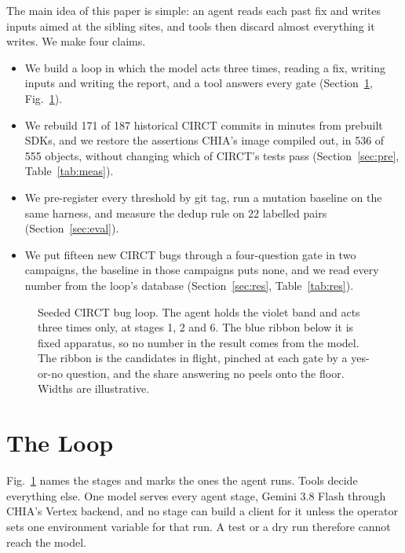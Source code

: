 \documentclass[conference]{IEEEtran}
\begin{document}
The main idea of this paper is simple: an agent reads each past fix and writes
inputs aimed at the sibling sites, and tools then discard almost everything it
writes. We make four claims.
\begin{itemize}
\item We build a loop in which the model acts three times, reading a fix,
  writing inputs and writing the report, and a tool answers every gate
  (Section~\ref{sec:loop}, Fig.~\ref{fig:loop}).
\item We rebuild 171 of 187 historical CIRCT commits in minutes from prebuilt
  SDKs, and we restore the assertions CHIA's image compiled out, in 536 of 555
  objects, without changing which of CIRCT's tests pass
  (Section~\ref{sec:pre}, Table~\ref{tab:meas}).
\item We pre-register every threshold by git tag, run a mutation baseline on
  the same harness, and measure the dedup rule on 22 labelled pairs
  (Section~\ref{sec:eval}).
\item We put fifteen new CIRCT bugs through a four-question gate in two
  campaigns, the baseline in those campaigns puts none, and we read every number
  from the loop's
  database (Section~\ref{sec:res}, Table~\ref{tab:res}).
\end{itemize}

\begin{figure}[!t]
\centering
\scalebox{0.78}{}
\caption{Seeded CIRCT bug loop. The agent holds the violet band and acts three
times only, at stages 1, 2 and 6. The blue ribbon below it is fixed apparatus,
so no number in the result comes from the model. The ribbon is the candidates in
flight, pinched at each gate by a yes-or-no question, and the share answering no
peels onto the floor. Widths are illustrative.}
\label{fig:loop}
\end{figure}

\section{The Loop}\label{sec:loop}
Fig.~\ref{fig:loop} names the stages and marks the ones the agent runs. Tools
decide everything else. One model serves every agent stage, Gemini 3.8 Flash
through CHIA's Vertex backend, %
and no stage can build a client for it unless the operator sets one environment
variable for that run. A test or a dry run therefore cannot reach the model. %
\end{document}
